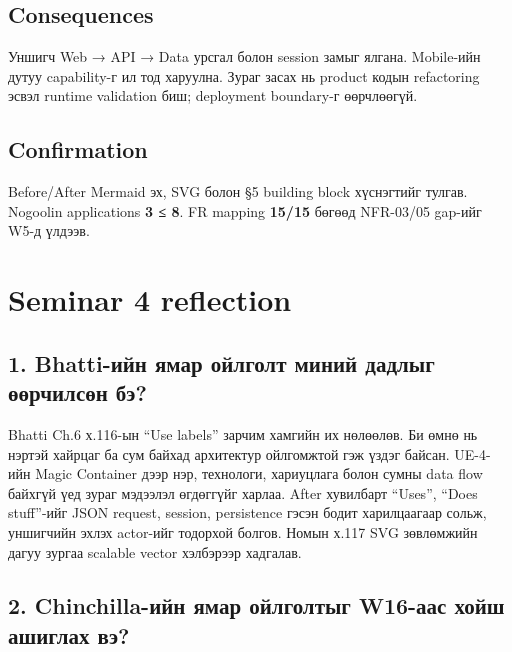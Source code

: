 \documentclass[
  mongolian,
]{article}
\begin{document}
\subsection{Consequences}\label{consequences-3}

Уншигч Web → API → Data урсгал болон session замыг ялгана. Mobile-ийн
дутуу capability-г ил тод харуулна. Зураг засах нь product кодын
refactoring эсвэл runtime validation биш; deployment boundary-г
өөрчлөөгүй.

\subsection{Confirmation}\label{confirmation-1}

Before/After Mermaid эх, SVG болон §5 building block хүснэгтийг тулгав.
Nogoolin applications \textbf{3 ≤ 8}. FR mapping \textbf{15/15} бөгөөд
NFR-03/05 gap-ийг W5-д үлдээв.

\newpage

\section{Seminar 4 reflection}\label{seminar-4-reflection}

\subsection{1. Bhatti-ийн ямар ойлголт миний дадлыг өөрчилсөн
бэ?}\label{bhatti-ux438ux439ux43d-ux44fux43cux430ux440-ux43eux439ux43bux433ux43eux43bux442-ux43cux438ux43dux438ux439-ux434ux430ux434ux43bux44bux433-ux4e9ux4e9ux440ux447ux438ux43bux441ux4e9ux43d-ux431ux44d}

Bhatti Ch.6 х.116-ын ``Use labels'' зарчим хамгийн их нөлөөлөв. Би өмнө
нь нэртэй хайрцаг ба сум байхад архитектур ойлгомжтой гэж үздэг байсан.
UE-4-ийн Magic Container дээр нэр, технологи, хариуцлага болон сумны
data flow байхгүй үед зураг мэдээлэл өгдөггүйг харлаа. After хувилбарт
``Uses'', ``Does stuff''-ийг JSON request, session, persistence гэсэн
бодит харилцаагаар сольж, уншигчийн эхлэх actor-ийг тодорхой болгов.
Номын х.117 SVG зөвлөмжийн дагуу зургаа scalable vector хэлбэрээр
хадгалав.

\subsection{2. Chinchilla-ийн ямар ойлголтыг W16-аас хойш ашиглах
вэ?}\label{chinchilla-ux438ux439ux43d-ux44fux43cux430ux440-ux43eux439ux43bux433ux43eux43bux442ux44bux433-w16-ux430ux430ux441-ux445ux43eux439ux448-ux430ux448ux438ux433ux43bux430ux445-ux432ux44d}
\end{document}
